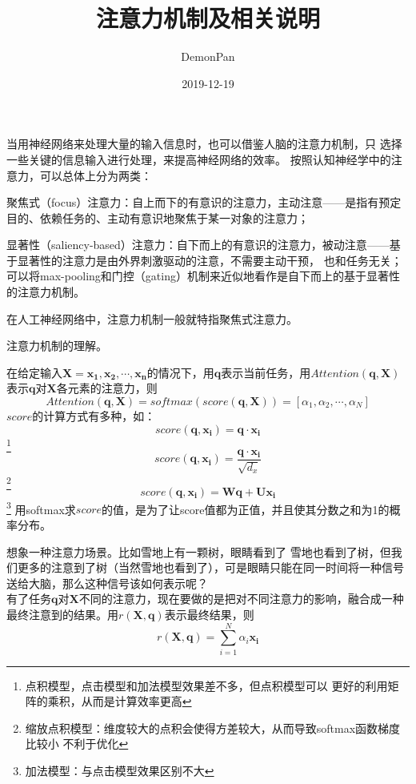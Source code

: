 \documentclass{ctexart}
\title{注意力机制及相关说明}
\author{DemonPan}
\date{2019-12-19}
\begin{document}
\maketitle
当用神经网络来处理大量的输入信息时，也可以借鉴人脑的注意力机制，只 选择一些关键的信息输入进行处理，来提高神经网络的效率。
按照认知神经学中的注意力，可以总体上分为两类：\cite{ref1}\par
聚焦式（focus）注意力：自上而下的有意识的注意力，主动注意——是指有预定目的、依赖任务的、主动有意识地聚焦于某一对象的注意力；\par
显著性（saliency-based）注意力：自下而上的有意识的注意力，被动注意——基于显著性的注意力是由外界刺激驱动的注意，不需要主动干预，
也和任务无关；可以将max-pooling和门控（gating）机制来近似地看作是自下而上的基于显著性的注意力机制。\par
在人工神经网络中，注意力机制一般就特指聚焦式注意力。\par
注意力机制的理解。\par
在给定输入$\mathbf{X}={{\mathbf{x_1},\mathbf{x_2},\cdots,\mathbf{x_n}}}$的情况下，用$\mathbf{q}$表示当前任务，用$Attention(\mathbf{q},\mathbf{X})$表示$\mathbf{q}$对$\mathbf{X}$各元素的注意力，则
\begin{equation}Attention(\mathbf{q},\mathbf{X}) = softmax(score(\mathbf{q},\mathbf{X})) = [\alpha_1,\alpha_2,\cdots,\alpha_N]\end{equation}
$score$的计算方式有多种，如：
\begin{equation}score(\mathbf{q},\mathbf{x_i}) = \mathbf{q} \cdot \mathbf{x_i}\end{equation}\footnote{点积模型，点击模型和加法模型效果差不多，但点积模型可以
更好的利用矩阵的乘积，从而是计算效率更高}
\begin{equation}score(\mathbf{q},\mathbf{x_i}) = \frac{\mathbf{q} \cdot \mathbf{x_i}}{\sqrt{d_x}}\end{equation}\footnote{缩放点积模型：维度较大的点积会使得方差较大，从而导致softmax函数梯度比较小
不利于优化}
\begin{equation}score(\mathbf{q},\mathbf{x_i}) = \mathbf{W}\mathbf{q} + \mathbf{U}\mathbf{x_i}\end{equation}\footnote{加法模型：与点击模型效果区别不大}
用softmax求$score$的值，是为了让score值都为正值，并且使其分数之和为1的概率分布。\par
想象一种注意力场景。比如雪地上有一颗树，眼睛看到了 雪地也看到了树，但我们更多的注意到了树（当然雪地也看到了），可是眼睛只能在同一时间将一种信号送给大脑，那么这种信号该如何表示呢？\\
有了任务$\mathbf{q}$对$\mathbf{X}$不同的注意力，现在要做的是把对不同注意力的影响，融合成一种最终注意到的结果。用$r(\mathbf{X},\mathbf{q})$表示最终结果，则
\begin{equation}r(\mathbf{X},\mathbf{q}) = \sum_{i=1}^{N}\alpha_i\mathbf{x_i}\end{equation}

 
\pagestyle{plain}
\end{document}

